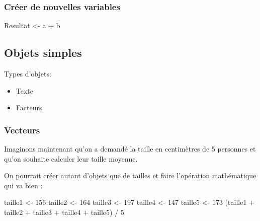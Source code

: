 \documentclass[
]{article}
\newenvironment{Shaded}{\begin{snugshade}}{\end{snugshade}}
\newcommand{\DecValTok}[1]{\textcolor[rgb]{0.00,0.00,0.81}{#1}}
\newcommand{\NormalTok}[1]{#1}
\newcommand{\OtherTok}[1]{\textcolor[rgb]{0.56,0.35,0.01}{#1}}
\newcommand{\SpecialCharTok}[1]{\textcolor[rgb]{0.00,0.00,0.00}{#1}}
\providecommand{\tightlist}{%
  \setlength{\itemsep}{0pt}\setlength{\parskip}{0pt}}
\begin{document}
\hypertarget{cruxe9er-de-nouvelles-variables}{%
\subsubsection{Créer de nouvelles
variables}\label{cruxe9er-de-nouvelles-variables}}

\begin{Shaded}
\begin{Highlighting}[]
\NormalTok{Resultat }\OtherTok{\textless{}{-}}\NormalTok{ a }\SpecialCharTok{+}\NormalTok{ b}
\end{Highlighting}
\end{Shaded}

\hypertarget{objets-simples}{%
\subsection{Objets simples}\label{objets-simples}}

Types d'objets:

\begin{itemize}
\tightlist
\item
  Texte
\item
  Facteurs
\end{itemize}

\hypertarget{vecteurs}{%
\subsubsection{Vecteurs}\label{vecteurs}}

Imaginons maintenant qu'on a demandé la taille en centimètres de 5
personnes et qu'on souhaite calculer leur taille moyenne.

On pourrait créer autant d'objets que de tailles et faire l'opération
mathématique qui va bien :

\begin{Shaded}
\begin{Highlighting}[]
\NormalTok{taille1 }\OtherTok{\textless{}{-}} \DecValTok{156}
\NormalTok{taille2 }\OtherTok{\textless{}{-}} \DecValTok{164}
\NormalTok{taille3 }\OtherTok{\textless{}{-}} \DecValTok{197}
\NormalTok{taille4 }\OtherTok{\textless{}{-}} \DecValTok{147}
\NormalTok{taille5 }\OtherTok{\textless{}{-}} \DecValTok{173}
\NormalTok{(taille1 }\SpecialCharTok{+}\NormalTok{ taille2 }\SpecialCharTok{+}\NormalTok{ taille3 }\SpecialCharTok{+}\NormalTok{ taille4 }\SpecialCharTok{+}\NormalTok{ taille5) }\SpecialCharTok{/} \DecValTok{5}
\end{Highlighting}
\end{Shaded}
\end{document}
